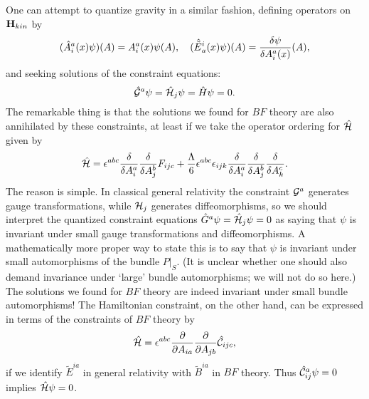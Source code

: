 One can attempt to quantize gravity in a similar fashion,
defining operators on ${\bf H}_{kin}$ by
\[     (\hat A_i^a(x) \psi)(A) = A_i^a(x)\psi(A), \quad
      (\hat {\tilde E}{}^i_a(x) \psi)(A) = {\delta \psi \over \delta
A_i^a(x)}(A),\]
and seeking solutions of the constraint equations:
\[        \hat \G^a \psi = \hat \H_j \psi = \hat H \psi = 0 .\]
The remarkable thing is that the solutions we found for $BF$ theory
are also annihilated by these constraints,
at least if we take the operator ordering for $\hat \H$ given by
\[   \hat \H = \epsilon^{abc} {\delta  \over \delta
A_i^a} {\delta  \over \delta A_j^b}
F_{ijc} + {\Lambda \over 6}\epsilon^{abc}\epsilon_{ijk}
{\delta  \over \delta A_i^a} {\delta  \over \delta
A_j^b} {\delta  \over \delta A_k^c}  .\]
The reason is simple.  In classical general relativity the constraint
$\G^a$ generates gauge transformations, while $\H_j$ generates
diffeomorphisms, so we should interpret the quantized constraint
equations $\hat G^a \psi = \hat \H_j \psi = 0$ as saying that $\psi$ is
invariant under small gauge transformations and diffeomorphisms.  A
mathematically more proper way to state this is to say that $\psi$ is
invariant under small automorphisms of the bundle $P|_S$.  (It is
unclear whether one should also demand invariance under `large' bundle
automorphisms; we will not do so here.)  The solutions we found for $BF$
theory are indeed invariant under small bundle automorphisms!  The
Hamiltonian constraint, on the other hand, can be expressed in terms of
the constraints of $BF$ theory by
\[        \hat \H =  \epsilon^{abc} {\partial\over
\partial A_{ia}}  {\partial\over \partial A_{jb}}
 \hat \Con_{ijc} ,\]
if we identify $\tilde E^{ia}$ in general relativity with $\tilde
B^{ia}$ in $BF$ theory.  Thus $\hat \Con_{ij}^a\psi = 0 $ implies $\hat
\H\psi = 0$.

